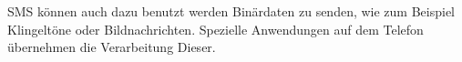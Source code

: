 \documentclass[german,12pt,a4paper]{article}
\begin{document}
SMS können auch dazu benutzt werden Binärdaten zu senden, wie zum Beispiel 
Klingeltöne oder Bildnachrichten. Spezielle Anwendungen auf 
dem Telefon übernehmen die Verarbeitung Dieser.


\end{document}
